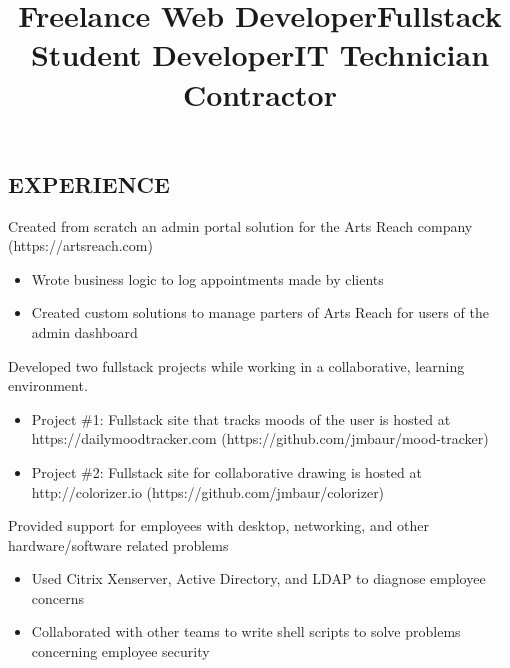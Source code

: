 \documentclass[margin]{res}
\begin{document}
\begin{resume}
\section{EXPERIENCE}

\title{\textbf{Freelance Web Developer}}
\begin{position}
	Created from scratch an admin portal solution for the Arts Reach company\\(https://artsreach.com)
	\begin{itemize}
		\item Wrote business logic to log appointments made by clients
		\item Created custom solutions to manage parters of Arts Reach for users of the admin dashboard
	\end{itemize}
\end{position}

\title{\textbf{Fullstack Student Developer}}
\begin{position}
	Developed two fullstack projects while working in a collaborative, learning environment.
	\begin{itemize}
		\item Project \#1: Fullstack site that tracks moods of the user is hosted at\\https://dailymoodtracker.com (https://github.com/jmbaur/mood-tracker)
		\item Project \#2: Fullstack site for collaborative drawing is hosted at\\http://colorizer.io (https://github.com/jmbaur/colorizer)
	\end{itemize}
\end{position}

\title{\textbf{IT Technician} Contractor}
\begin{position}
	Provided support for employees with desktop, networking, and other hardware/software related problems
	\begin{itemize}
		\item Used Citrix Xenserver, Active Directory, and LDAP to diagnose employee concerns
		\item Collaborated with other teams to write shell scripts to solve problems concerning employee security
	\end{itemize}
\end{position}


\end{resume}
\end{document}
